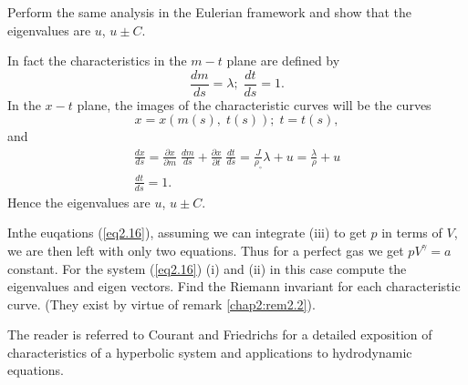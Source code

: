 \setcounter{exercise}{0}
\begin{exercise}\label{chap2:exer2.1}
Perform the same analysis in the Eulerian framework and show that the
eigenvalues are $u$, $u \pm C$.
\end{exercise}

\begin{remark}\label{chap2:rem2.5}
In fact the characteristics in the $m-t$ plane are defined by
$$
\frac{dm}{ds} = \lambda ; \; \frac{dt}{ds} = 1.
$$
In the $x-t$ plane, the images of the characteristic curves will be
the curves
$$
x = x (m(s), \; t(s)); \; t = t(s),
$$
and 
\begin{gather*}
\frac{dx}{ds} = \frac{\partial x}{\partial m} \; \frac{dm}{ds} +
\frac{\partial x}{\partial t} \; \frac{dt}{ds} =
\frac{J}{\rho_\circ} \lambda + u =\frac{\lambda}{\rho} + u\\
\frac{dt}{ds} = 1.
\end{gather*}
Hence the eigenvalues are $u$, $u\pm C$. 
\end{remark}

\begin{exercise}\label{chap2:exer2.2}
In\pageoriginale the euqations (\ref{eq2.16}), assuming we can integrate (iii)
to get $p$ in terms of $V$, we are then left with only two
equations. Thus for a perfect gas we get $pV^\gamma =a$ constant. For
the system (\ref{eq2.16}) (i) and (ii) in this case compute the eigenvalues
and eigen vectors. Find the Riemann invariant for each characteristic
curve. (They exist by virtue of remark \ref{chap2:rem2.2}).
\end{exercise}


\medskip
{}
The reader is referred to Courant and Friedrichs \cite{key9} for a
detailed exposition of characteristics of a hyperbolic system and
applications to hydrodynamic equations. 
